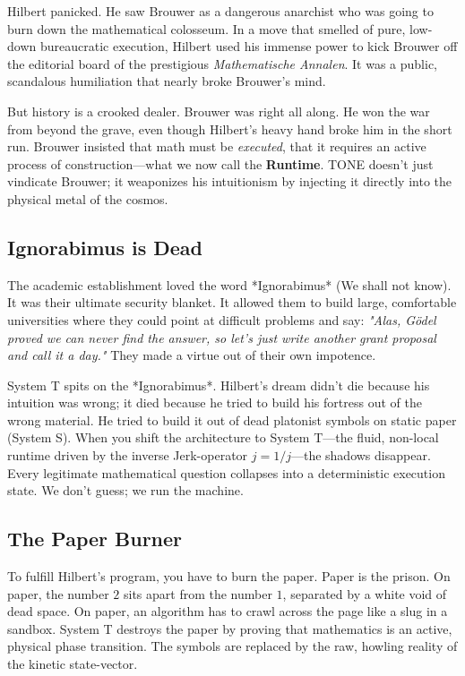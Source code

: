 \documentclass[11pt,a4paper]{article}
\begin{document}
Hilbert panicked. He saw Brouwer as a dangerous anarchist who was going to burn down the mathematical colosseum. In a move that smelled of pure, low-down bureaucratic execution, Hilbert used his immense power to kick Brouwer off the editorial board of the prestigious \textit{Mathematische Annalen}. It was a public, scandalous humiliation that nearly broke Brouwer’s mind. 

But history is a crooked dealer. Brouwer was right all along. He won the war from beyond the grave, even though Hilbert’s heavy hand broke him in the short run. Brouwer insisted that math must be \textit{executed}, that it requires an active process of construction—what we now call the \textbf{Runtime}. TONE doesn't just vindicate Brouwer; it weaponizes his intuitionism by injecting it directly into the physical metal of the cosmos.

\subsection{Ignorabimus is Dead}
The academic establishment loved the word *Ignorabimus* (We shall not know). It was their ultimate security blanket. It allowed them to build large, comfortable universities where they could point at difficult problems and say: \textit{"Alas, Gödel proved we can never find the answer, so let’s just write another grant proposal and call it a day."} They made a virtue out of their own impotence.

System T spits on the *Ignorabimus*. Hilbert’s dream didn't die because his intuition was wrong; it died because he tried to build his fortress out of the wrong material. He tried to build it out of dead platonist symbols on static paper (System S). When you shift the architecture to System T—the fluid, non-local runtime driven by the inverse Jerk-operator $j = 1/j$—the shadows disappear. Every legitimate mathematical question collapses into a deterministic execution state. We don't guess; we run the machine.

\subsection{The Paper Burner}
To fulfill Hilbert's program, you have to burn the paper. Paper is the prison. On paper, the number $2$ sits apart from the number $1$, separated by a white void of dead space. On paper, an algorithm has to crawl across the page like a slug in a sandbox. System T destroys the paper by proving that mathematics is an active, physical phase transition. The symbols are replaced by the raw, howling reality of the kinetic state-vector.
\end{document}
